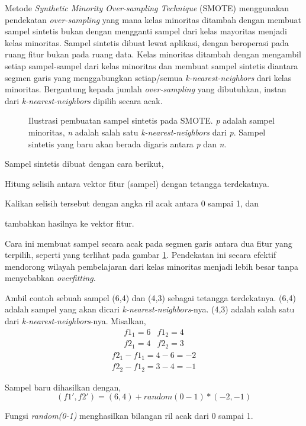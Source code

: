 Metode \textit{Synthetic Minority Over-sampling Technique} (SMOTE)
\cite{chawla2002smote} menggunakan pendekatan \textit{over-sampling} yang mana
kelas minoritas ditambah dengan membuat sampel sintetis bukan dengan
mengganti sampel dari kelas mayoritas menjadi kelas minoritas.
Sampel sintetis dibuat lewat aplikasi, dengan beroperasi pada
ruang fitur bukan pada ruang data.
Kelas minoritas ditambah dengan mengambil setiap sampel-sampel dari kelas
minoritas dan membuat sampel sintetis diantara segmen garis yang menggabungkan
setiap/semua \textit{k-nearest-neighbors} dari kelas minoritas.
Bergantung kepada jumlah \textit{over-sampling} yang dibutuhkan, instan dari
\textit{k-nearest-neighbors} dipilih secara acak.

\begin{figure}[htbp]
\centering
\setlength\fboxsep{4pt}
	\caption{Ilustrasi pembuatan sampel sintetis pada SMOTE.
	\textit{p} adalah sampel minoritas, \textit{n} adalah salah satu
	\textit{k-nearest-neighbors} dari \textit{p}.
	Sampel sintetis yang baru akan berada digaris antara \textit{p} dan
	\textit{n}.
	}
	\label{fig:smote}
\end{figure}

Sampel sintetis dibuat dengan cara berikut,
\begin{compactitem}%
	\item Hitung selisih antara vektor fitur (sampel) dengan tetangga
	terdekatnya.
	\item Kalikan selisih tersebut dengan angka ril acak antara 0 sampai 1,
	dan
	\item tambahkan hasilnya ke vektor fitur.
\end{compactitem}

Cara ini membuat sampel secara acak pada segmen garis antara dua fitur yang
terpilih, seperti yang terlihat pada gambar \ref{fig:smote}.
Pendekatan ini secara efektif mendorong wilayah pembelajaran dari kelas
minoritas menjadi lebih besar tanpa menyebabkan \textit{overfitting}.

Ambil contoh sebuah sampel (6,4) dan (4,3) sebagai tetangga terdekatnya.
(6,4) adalah sampel yang akan dicari \textit{k-nearest-neighbors}-nya.
(4,3) adalah salah satu dari \textit{k-nearest-neighbors}-nya.
Misalkan,
\[
\begin{matrix}
f1_1 = 6 & f1_2 = 4 \\
f2_1 = 4 & f2_2 = 3
\end{matrix}
\]
\[
\begin{matrix}
f2_1 - f1_1 = 4 - 6 = -2 \\
f2_2 - f1_2 = 3 - 4 = -1
\end{matrix}
\]

Sampel baru dihasilkan dengan,
\[
(f1', f2') = (6,4) + random(0-1) * (-2,-1)
\]

Fungsi \textit{random(0-1)} menghasilkan bilangan ril acak dari 0 sampai 1.
